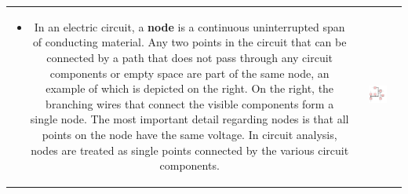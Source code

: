 \documentclass{article}
\begin{document}
\begin{tabular}{cc}
\parbox{0.5\textwidth}{ 
\begin{itemize}
\item In an electric circuit, a {\bf node} is a continuous uninterrupted span of conducting material. Any two points in the circuit that can be connected by a path that does not pass through any circuit components or empty space are part of the same node, an example of which is depicted on the right. On the right, the branching wires that connect the visible components form a single node. The most important detail regarding nodes is that all points on the node have the same voltage. In circuit analysis, nodes are treated as single points connected by the various circuit components. 
\end{itemize}
} & \parbox{0.5\textwidth}{
\includegraphics[width = 0.5\textwidth]{circuit_node_definition}
}
\end{tabular}

\end{document}
